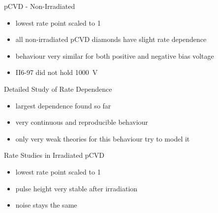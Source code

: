 \begin{frame}{pCVD - Non-Irradiated}
 
	
	
	\begin{itemize} \itemfill
		\item lowest rate point scaled to 1
		\item all non-irradiated pCVD diamonds have slight rate dependence
		\item behaviour very similar for both positive and negative bias voltage
		\item II6-97 did not hold \SI[retain-explicit-plus]{+1000}{\volt}
	\end{itemize}
 
\end{frame}
\begin{frame}{Detailed Study of Rate Dependence}

	\vspace*{-15pt}
	
	\begin{itemize}\itemfill
		\item largest dependence found so far
		\item very continuous and reproducible behaviour
		\item only very weak theories for this behaviour \ra try to model it
	\end{itemize}

\end{frame}
\begin{frame}{Rate Studies in Irradiated pCVD}

	\vspace*{-15pt}
	
	\begin{itemize}\itemfill
		\item lowest rate point scaled to 1
		\item pulse height very stable after irradiation
		\item noise stays the same
	\end{itemize}

\end{frame}
